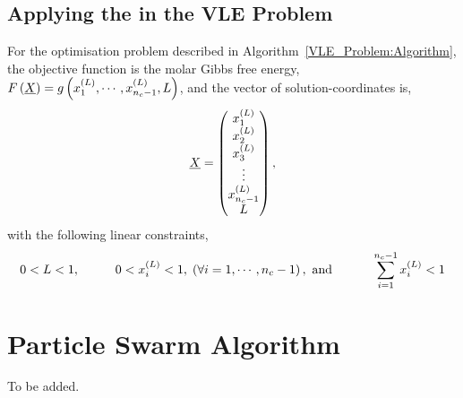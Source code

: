 \subsection{Applying the \SAA in the VLE Problem}
For the optimisation problem described in Algorithm~\ref{VLE_Problem:Algorithm}, the objective function is the molar Gibbs free energy, \ie $F\left(\underline{X}\right) = g\left(\mfr[x]{1}{L},\cdots,\mfr[x]{n_{c}-1}{L},L\right)$,  and the vector of solution-coordinates is,
     \begin{displaymath}
          \underline{X} = 
                 \begin{pmatrix}\mfr[x]{1}{L} \\ \mfr[x]{2}{L} \\  \mfr[x]{3}{L} \\ \vdots \\  \mfr[x]{n_{c}-1}{L} \\ L \end{pmatrix},
     \end{displaymath}
with the following linear constraints,
     \begin{displaymath}
           0 < L < 1, \hspace{1cm} 0 < \mfr[x]{i}{L} < 1,\;\left(\forall i=1,\cdots,n_{c}-1\right), \text{ and } \hspace{1cm} \summation_{i=1}^{n_{c}-1}\mfr[x]{i}{L} < 1
     \end{displaymath}









\section{Particle Swarm Algorithm}

To be added.
